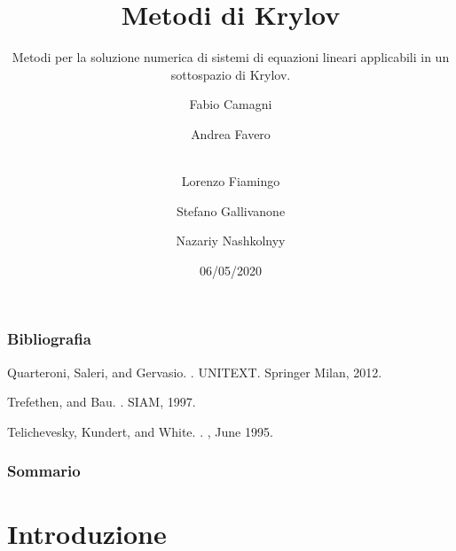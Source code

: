 \documentclass[10pt]{beamer}
\begin{document}
\begin{frame}
  \title{Metodi di Krylov}
  \subtitle{Metodi per la soluzione numerica di sistemi di equazioni lineari applicabili in un sottospazio di Krylov.}
  \date{06/05/2020}
  \author[Principal]{Fabio Camagni \and Andrea Favero \and  \\Lorenzo Fiamingo \and Stefano Gallivanone \and Nazariy Nashkolnyy}
  \maketitle
\end{frame}

\begin{frame}
    \frametitle{Bibliografia}
    
  \begin{thebibliography}{99}\small
    Quarteroni, Saleri, and Gervasio.
    .
    \newblock UNITEXT. Springer Milan, 2012.

    Trefethen, and Bau.
    .
    \newblock SIAM, 1997.
    
    Telichevesky, Kundert, and White.
    .
    , June 1995.

   \end{thebibliography}

  
\end{frame}  

\begin{frame}
  \frametitle{Sommario}
  \tableofcontents
\end{frame}

\section{Introduzione}\label{sec:sec1}
\end{document}

